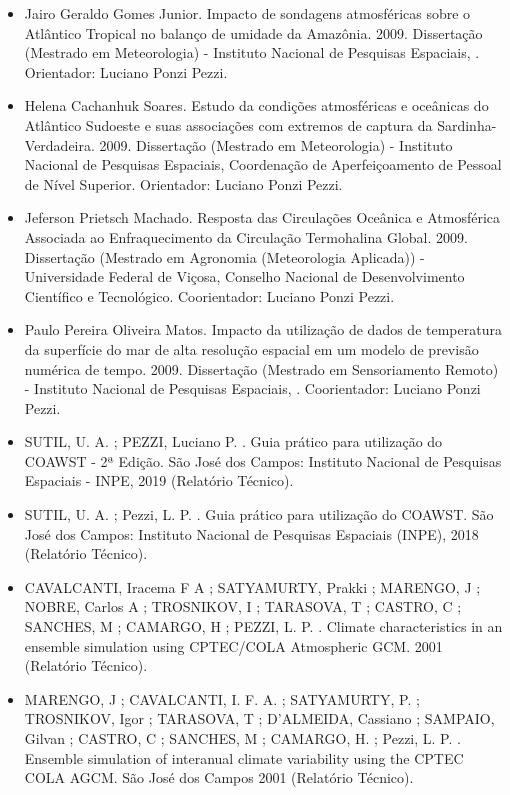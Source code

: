\documentclass[11pt, a4paper]{awesome-cv}
\begin{document}
\begin{cvletter}
\begin{itemize}
  \item[] Jairo Geraldo Gomes Junior. Impacto de sondagens atmosféricas sobre o Atlântico Tropical no balanço de umidade da Amazônia. 2009. Dissertação (Mestrado em Meteorologia) - Instituto Nacional de Pesquisas Espaciais, . Orientador: Luciano Ponzi Pezzi. 
  \item[] Helena Cachanhuk Soares. Estudo da condições atmosféricas e oceânicas do Atlântico Sudoeste e suas associações com extremos de captura da Sardinha-Verdadeira. 2009. Dissertação (Mestrado em Meteorologia) - Instituto Nacional de Pesquisas Espaciais, Coordenação de Aperfeiçoamento de Pessoal de Nível Superior. Orientador: Luciano Ponzi Pezzi. 
  \item[] Jeferson Prietsch Machado. Resposta das Circulações Oceânica e Atmosférica Associada ao Enfraquecimento da Circulação Termohalina Global. 2009. Dissertação (Mestrado em Agronomia (Meteorologia Aplicada)) - Universidade Federal de Viçosa, Conselho Nacional de Desenvolvimento Científico e Tecnológico. Coorientador: Luciano Ponzi Pezzi. 
  \item[] Paulo Pereira Oliveira Matos. Impacto da utilização de dados de temperatura da superfície do mar de alta resolução espacial em um modelo de previsão numérica de tempo. 2009. Dissertação (Mestrado em Sensoriamento Remoto) - Instituto Nacional de Pesquisas Espaciais, . Coorientador: Luciano Ponzi Pezzi.
\end{itemize}

\begin{itemize}
  \item[] SUTIL, U. A. ; PEZZI, Luciano P. . Guia prático para utilização do COAWST - 2ª Edição. São José dos Campos: Instituto Nacional de Pesquisas Espaciais - INPE, 2019 (Relatório Técnico). 
  \item[] SUTIL, U. A. ; Pezzi, L. P. . Guia prático para utilização do COAWST. São José dos Campos: Instituto Nacional de Pesquisas Espaciais (INPE), 2018 (Relatório Técnico).
  \item[] CAVALCANTI, Iracema F A ; SATYAMURTY, Prakki ; MARENGO, J ; NOBRE, Carlos A ; TROSNIKOV, I ; TARASOVA, T ; CASTRO, C ; SANCHES, M ; CAMARGO, H ; PEZZI, L. P. . Climate characteristics in an ensemble simulation using CPTEC/COLA Atmospheric GCM. 2001 (Relatório Técnico).
  \item[] MARENGO, J ; CAVALCANTI, I. F. A. ; SATYAMURTY, P. ; TROSNIKOV, Igor ; TARASOVA, T ; D'ALMEIDA, Cassiano ; SAMPAIO, Gilvan ; CASTRO, C ; SANCHES, M ; CAMARGO, H. ; Pezzi, L. P. . Ensemble simulation of interanual climate variability using the CPTEC COLA AGCM. São José dos Campos 2001 (Relatório Técnico). 
\end{itemize}


\end{cvletter}
\end{document}
